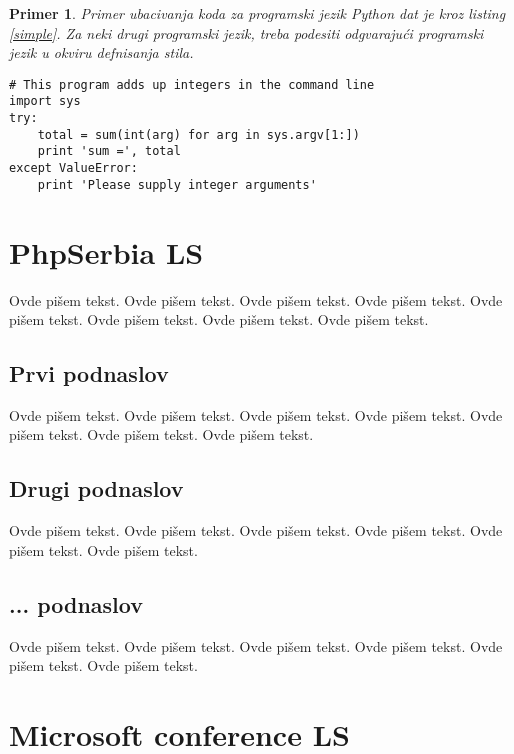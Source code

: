 \documentclass[a4paper]{article}
\newtheorem{primer}{Primer}[section]
\begin{document}
\begin{primer}
Primer ubacivanja koda za programski jezik Python dat je kroz listing \ref{simple}. Za neki drugi programski jezik, treba podesiti odgvarajući programski jezik u okviru defnisanja stila.
\end{primer}
\begin{lstlisting}[caption={Primer ubacivanja koda u tekst},frame=single, label=simple]
# This program adds up integers in the command line
import sys
try:
    total = sum(int(arg) for arg in sys.argv[1:])
    print 'sum =', total
except ValueError:
    print 'Please supply integer arguments'
\end{lstlisting}


\section{PhpSerbia LS}
\label{sec:naslov1}


Ovde pišem tekst. 
Ovde pišem tekst. 
Ovde pišem tekst. 
Ovde pišem tekst. 
Ovde pišem tekst. 
Ovde pišem tekst. 
Ovde pišem tekst. 
Ovde pišem tekst. 


\subsection{Prvi podnaslov}
\label{subsec:podnaslov1}

Ovde pišem tekst. 
Ovde pišem tekst. 
Ovde pišem tekst. 
Ovde pišem tekst. 
Ovde pišem tekst. 
Ovde pišem tekst. 
Ovde pišem tekst. 

\subsection{Drugi podnaslov}
\label{subsec:podnaslov2}

Ovde pišem tekst. 
Ovde pišem tekst. 
Ovde pišem tekst. 
Ovde pišem tekst. 
Ovde pišem tekst. 
Ovde pišem tekst. 


\subsection{... podnaslov}
\label{subsec:podnaslovN}

Ovde pišem tekst. 
Ovde pišem tekst. 
Ovde pišem tekst. 
Ovde pišem tekst. 
Ovde pišem tekst. 
Ovde pišem tekst. 

\section{Microsoft conference LS}
\label{sec:naslovN}
\end{document}
